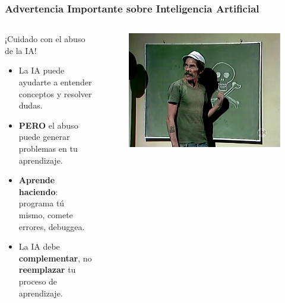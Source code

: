 \documentclass[10pt]{beamer}
\begin{document}
\begin{frame}
  \frametitle{Advertencia Importante sobre Inteligencia Artificial}
  
  \begin{columns}
    \begin{column}{0.6\textwidth}
      \begin{alertblock}{¡Cuidado con el abuso de la IA!}
        \begin{itemize}
          \item La IA puede ayudarte a entender conceptos y resolver dudas.
          \item \textbf{PERO} el abuso puede generar problemas en tu aprendizaje.
          \item \textbf{Aprende haciendo}: programa tú mismo, comete errores, debuggea.
          \item La IA debe \textbf{complementar}, no \textbf{reemplazar} tu proceso de aprendizaje.
        \end{itemize}
      \end{alertblock}
    \end{column}
    \begin{column}{0.40\textwidth}
      \begin{figure}
        \includegraphics[width=\textwidth]{4) Peligro/Don Ramon.png}
      \end{figure}
    \end{column}
  \end{columns}
\end{frame}
\end{document}
